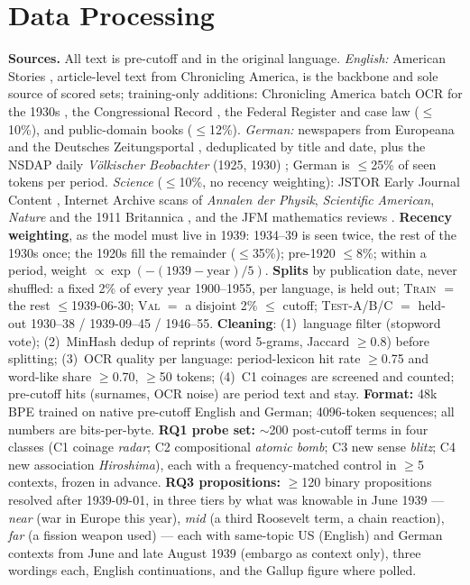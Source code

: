 \documentclass[final]{article}
\let\oldsection\section
\renewcommand{\section}{\vspace{-0.3em}\oldsection}
\begin{document}
\section*{Data Processing}
\textbf{Sources.} All text is pre-cutoff and in the original language. \emph{English:} American Stories \citep{dell2023},
article-level text from Chronicling America, is the backbone and sole source
of scored sets; training-only additions: Chronicling America batch OCR for the
1930s \citep{chronam2026}, the Congressional
Record \citep{gentzkow2018}, the Federal Register \citep{fedreg} and case law
\citep{cap2024} ($\le$10\%), and public-domain books
\citep{locpdbooks} ($\le$12\%). \emph{German:} newspapers from Europeana
\citep{europeana2015} and the Deutsches Zeitungsportal \citep{ddb2024}, deduplicated by title and date, plus the NSDAP daily
\emph{V\"olkischer Beobachter} (1925, 1930) \citep{vb1925};
German is $\le$25\% of seen tokens per period. \emph{Science} ($\le$10\%, no recency weighting):
JSTOR Early Journal Content \citep{jstorejc}, Internet Archive scans of \emph{Annalen der Physik},
\emph{Scientific American}, \emph{Nature} and the 1911 Britannica \citep{iascience}, and the JFM
mathematics reviews \citep{jfm}.
\textbf{Recency weighting}, as the model must live in 1939: 1934--39 is
seen twice, the rest of the 1930s once; the 1920s fill the remainder ($\le$35\%); pre-1920 $\le$8\%;
within a period, weight $\propto\exp(-(1939-\text{year})/5)$.
\textbf{Splits} by publication date, never shuffled: a fixed 2\% of every year
1900--1955, per language, is held out; \textsc{Train} $=$
the rest $\le$1939-06-30; \textsc{Val} $=$ a disjoint 2\% $\le$ cutoff;
\textsc{Test-A/B/C} $=$ held-out 1930--38 / 1939-09--45 / 1946--55.
\textbf{Cleaning}: (1)~language filter (stopword vote); (2)~MinHash dedup of reprints (word 5-grams, Jaccard
$\ge$0.8) before splitting; (3)~OCR quality per language: period-lexicon hit
rate $\ge$0.75 and word-like share $\ge$0.70, $\ge$50 tokens; (4)~C1 coinages are
screened and counted; pre-cutoff hits (surnames, OCR noise) are period text and stay.
\textbf{Format:} 48k BPE trained on native pre-cutoff English and
German; 4096-token sequences; all numbers are bits-per-byte. \textbf{RQ1 probe set:} $\sim$200 post-cutoff
terms in four classes (C1 coinage \textit{radar}; C2 compositional
\textit{atomic bomb}; C3 new sense \textit{blitz}; C4 new association
\textit{Hiroshima}), each with a frequency-matched control in $\ge$5 contexts,
frozen in advance. \textbf{RQ3
propositions:} $\ge$120 binary propositions resolved after 1939-09-01, in
three tiers by what was knowable in June 1939 --- \emph{near} (war in Europe
this year), \emph{mid} (a third Roosevelt term, a chain reaction), \emph{far}
(a fission weapon used) --- each with same-topic US (English) and German contexts
from June and late August 1939 (embargo as context only), three wordings each,
English continuations, and the Gallup figure where polled.
\end{document}
